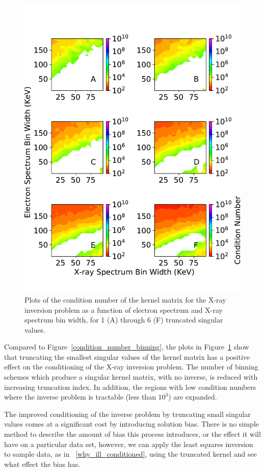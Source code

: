 \begin{figure}[p]
    \centering
    \includegraphics[width=.95\textwidth]{figures/fig_6.pdf}
    \caption{Plots of the condition number of the kernel matrix for the X-ray inversion problem as a function of electron spectrum and X-ray spectrum bin width, for 1 (A) through 6 (F) truncated singular values.}
    \label{condition-number-binning-tsvd}
\end{figure}

Compared to Figure~\ref{condition_number_binning}, the plots in Figure~\ref{condition-number-binning-tsvd} show that truncating the smallest singular values of the kernel matrix has a positive effect on the conditioning of the X-ray inversion problem. The number of binning schemes which produce a singular kernel matrix, with no inverse, is reduced with increasing truncation index. In addition, the regions with low condition numbers where the inverse problem is tractable (less than $10^3$) are expanded. 

The improved conditioning of the inverse problem by truncating small singular values comes at a significant cost by introducing solution bias. There is no simple method to describe the amount of bias this process introduces, or the effect it will have on a particular data set, however, we can apply the least squares inversion to sample data, as in ~\ref{why_ill_conditioned}, using the truncated kernel and see what effect the bias has. 

